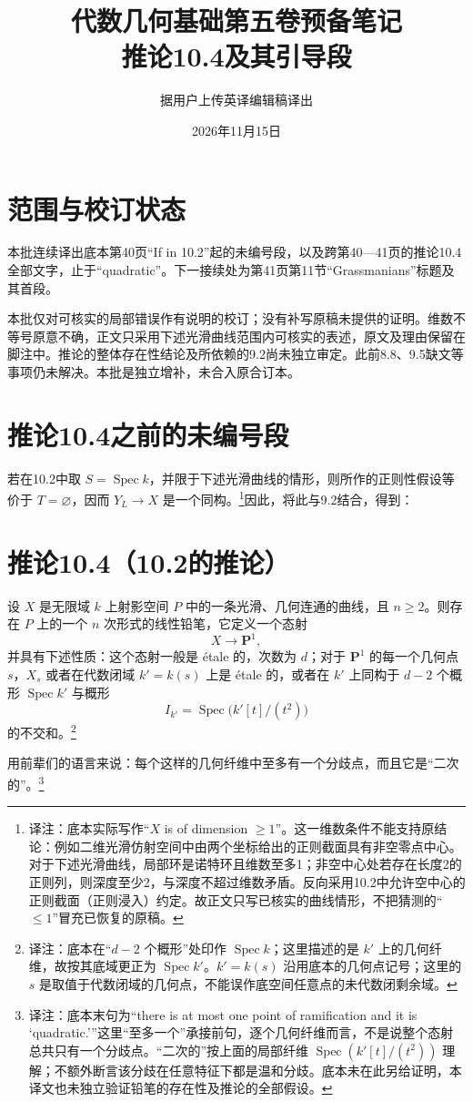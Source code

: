 \documentclass[openany]{ctexbook}
\title{代数几何基础第五卷预备笔记\\推论10.4及其引导段}
\author{据用户上传英译编辑稿译出}
\date{2026年11月15日}
\newcommand{\note}[1]{\footnote{译注：#1}}
\begin{document}
\maketitle
\chapter*{范围与校订状态}
本批连续译出底本第40页“If in 10.2”起的未编号段，以及跨第40—41页的推论10.4全部文字，止于“quadratic”。下一接续处为第41页第11节“Grassmanians”标题及其首段。

本批仅对可核实的局部错误作有说明的校订；没有补写原稿未提供的证明。维数不等号原意不确，正文只采用下述光滑曲线范围内可核实的表述，原文及理由保留在脚注中。推论的整体存在性结论及所依赖的9.2尚未独立审定。此前8.8、9.5缺文等事项仍未解决。本批是独立增补，未合入原合订本。
\chapter*{推论10.4之前的未编号段}
若在10.2中取 $S=\operatorname{Spec}k$，并限于下述光滑曲线的情形，则所作的正则性假设等价于 $T=\varnothing$，因而 $Y_L\to X$ 是一个同构。\note{底本实际写作“$X$ is of dimension $\geq1$”。这一维数条件不能支持原结论：例如二维光滑仿射空间中由两个坐标给出的正则截面具有非空零点中心。对于下述光滑曲线，局部环是诺特环且维数至多1；非空中心处若存在长度2的正则列，则深度至少2，与深度不超过维数矛盾。反向采用10.2中允许空中心的正则截面（正则浸入）约定。故正文只写已核实的曲线情形，不把猜测的“$\leq1$”冒充已恢复的原稿。}因此，将此与9.2结合，得到：
\chapter*{推论10.4（10.2的推论）}
设 $X$ 是无限域 $k$ 上射影空间 $P$ 中的一条光滑、几何连通的曲线，且 $n\geq2$。则存在 $P$ 上的一个 $n$ 次形式的线性铅笔，它定义一个态射
\[
X\longrightarrow\mathbf P^1,
\]
并具有下述性质：这个态射一般是 étale 的，次数为 $d$；对于 $\mathbf P^1$ 的每一个几何点 $s$，$X_s$ 或者在代数闭域 $k'=k(s)$ 上是 étale 的，或者在 $k'$ 上同构于 $d-2$ 个概形 $\operatorname{Spec}k'$ 与概形
\[
I_{k'}=\operatorname{Spec}\bigl(k'[t]/(t^2)\bigr)
\]
的不交和。\note{底本在“$d-2$ 个概形”处印作 $\operatorname{Spec}k$；这里描述的是 $k'$ 上的几何纤维，故按其底域更正为 $\operatorname{Spec}k'$。$k'=k(s)$ 沿用底本的几何点记号；这里的 $s$ 是取值于代数闭域的几何点，不能误作底空间任意点的未代数闭剩余域。}

用前辈们的语言来说：每个这样的几何纤维中至多有一个分歧点，而且它是“二次的”。\note{底本末句为“there is at most one point of ramification and it is ‘quadratic.’”这里“至多一个”承接前句，逐个几何纤维而言，不是说整个态射总共只有一个分歧点。“二次的”按上面的局部纤维 $\operatorname{Spec}(k'[t]/(t^2))$ 理解；不额外断言该分歧在任意特征下都是温和分歧。底本未在此另给证明，本译文也未独立验证铅笔的存在性及推论的全部假设。}
\end{document}
